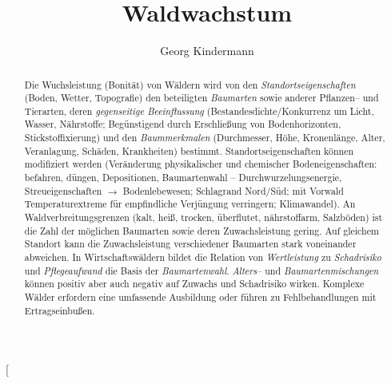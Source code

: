 \documentclass[twocolumn]{scrartcl}
\title{Waldwachstum}
\author{Georg Kindermann}
\begin{document}
\twocolumn[
  \begin{@twocolumnfalse}
    \maketitle
    \centering{\bfseries \Large\abstractname}
    \begin{abstract}
      Die Wuchsleistung (Bonität) von Wäldern wird von den
      \emph{Standortseigenschaften} (Boden, Wetter, Topografie) den beteiligten
      \emph{Baumarten} sowie anderer Pflanzen-- und Tierarten, deren
      \emph{gegenseitige Beeinflussung} (Bestandesdichte/Konkurrenz um Licht,
      Wasser, Nährstoffe; Begünstigend durch Erschließung von Bodenhorizonten,
      Stickstoffixierung) und den \emph{Baummerkmalen} (Durchmesser, Höhe,
      Kronenlänge, Alter, Veranlagung, Schäden, Krankheiten) bestimmt.
      Standortseigenschaften können modifiziert werden (Veränderung
      physikalischer und chemischer Bodeneigenschaften: befahren, düngen,
      Depositionen, Baumartenwahl -- Durchwurzelungsenergie, Streueigenschaften
      $\rightarrow$ Bodenlebewesen; Schlagrand Nord/Süd; mit Vorwald
      Temperaturextreme für empfindliche Verjüngung verringern; Klimawandel). An
      Waldverbreitungsgrenzen (kalt, heiß, trocken, überflutet, nährstoffarm,
      Salzböden) ist die Zahl der möglichen Baumarten sowie deren
      Zuwachsleistung gering. Auf gleichem Standort kann die Zuwachsleistung
      verschiedener Baumarten stark voneinander abweichen. In Wirtschaftswäldern
      bildet die Relation von \emph{Wertleistung} zu \emph{Schadrisiko} und
      \emph{Pflegeaufwand} die Basis der \emph{Baumartenwahl}. \emph{Alters--}
      und \emph{Baumartenmischungen} können positiv aber auch negativ auf
      Zuwachs und Schadrisiko wirken. Komplexe Wälder erfordern eine umfassende
      Ausbildung oder führen zu Fehlbehandlungen mit Ertragseinbußen.


\end{abstract}
\end{@twocolumnfalse}
\end{document}
